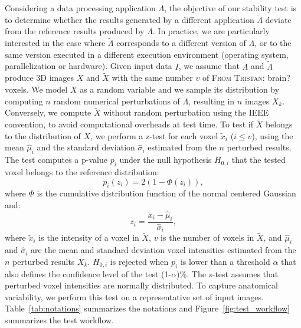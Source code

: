 \documentclass[lettersize,journal]{IEEEtran}
\newcommand{\TG}[1]{\color{blue}\textsc{From Tristan:} #1\color{black}\xspace}
\begin{document}
Considering a data processing application $\Lambda$, the objective of our stability test is to determine whether the results generated by a different application $\tilde \Lambda$ deviate from the reference results produced by $\Lambda$. In practice, we are particularly interested in the case where $\tilde \Lambda$ corresponds to a different version of $\Lambda$, or to the same version executed in a different execution environment (operating system, parallelization or hardware). Given input data $I$, we assume that $\Lambda$ and $\tilde \Lambda$ produce 3D images $X$ and $\tilde X$ with the same number $v$ of \TG{brain?} voxels. We model $X$ as a random variable and we sample its distribution by computing $n$ random numerical perturbations of $\Lambda$, resulting in $n$ images $X_k$. Conversely, we compute $\tilde X$ without random perturbation using the IEEE convention, to avoid computational overheads at test time. To test if $\tilde X$ belongs to the distribution of $X$, we perform a z-test for each voxel $\tilde x_i$ ($i\leq v$), using the mean $\hat \mu_i$ and the standard deviation $\hat \sigma_i$ estimated from the $n$ perturbed results. The test computes a p-value $p_i$ under the null hypothesis $H_{0,i}$ that the tested voxel belongs to the reference distribution:
\begin{equation} \label{eq:pval}
    p_i(z_i) = 2 \left(1-\Phi(z_i)\right),
\end{equation}
where $\Phi$ is the cumulative distribution function of the normal centered
Gaussian and:
\begin{equation*}
    z_i = \frac{\tilde x_i-\hat \mu_i}{\hat \sigma_i},
\end{equation*}
where $\tilde x_i$ is the intensity of a voxel in $\tilde X$, $v$ is the number of voxels in $\tilde X$, and $\hat \mu_i$ and $\hat \sigma_i$ are the mean and standard deviation voxel intensities estimated from the $n$ perturbed results $X_k$. $H_{0,i}$ is rejected when $p_i$ is lower than a threshold $\alpha$ that also defines the confidence level of the test (1-$\alpha$)\%. The z-test assumes that perturbed voxel intensities are normally distributed. To capture anatomical variability, we perform this test on a representative set of input images. Table~\ref{tab:notations} summarizes the notations and Figure~\ref{fig:test_workflow} summarizes the test workflow.
\end{document}
